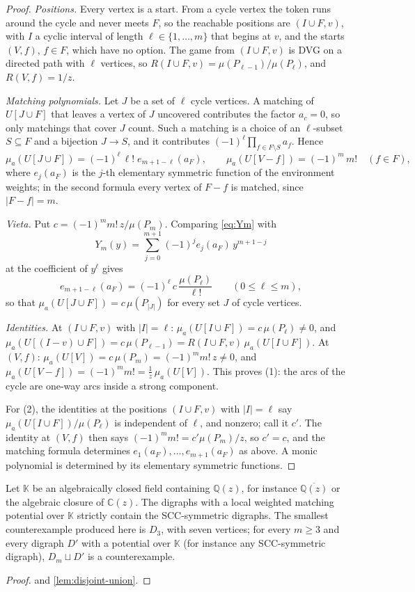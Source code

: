 \documentclass[final]{siamart0516}
\numberwithin{theorem}{section}
\numberwithin{equation}{section}
\theoremstyle{siamnonum}
\theoremstyle{plain}
\newcommand{\QQ}{\mathbb{Q}}
\newcommand{\CC}{\mathbb{C}}
\newcommand{\Qz}{\QQ(z)}
\newcommand{\Qzbar}{\overline{\QQ(z)}}
\begin{document}
\begin{proof}
\emph{Positions.} Every vertex is a start. From a cycle vertex the token runs around the cycle and never meets $F$, so the reachable positions are $(I\cup F,v)$, with $I$ a cyclic interval of length $\ell\in\{1,\dots,m\}$ that begins at $v$, and the starts $(V,f)$, $f\in F$, which have no option. The game from $(I\cup F,v)$ is DVG on a directed path with $\ell$ vertices, so $R(I\cup F,v)=\mu(P_{\ell-1})/\mu(P_\ell)$, and $R(V,f)=1/z$.

\emph{Matching polynomials.} Let $J$ be a set of $\ell$ cycle vertices. A matching of $U[J\cup F]$ that leaves a vertex of $J$ uncovered contributes the factor $a_c=0$, so only matchings that cover $J$ count. Such a matching is a choice of an $\ell$-subset $S\subseteq F$ and a bijection $J\to S$, and it contributes $(-1)^{\ell}\prod_{f\in F\setminus S}a_f$. Hence
\[
\mu_a(U[J\cup F])=(-1)^{\ell}\,\ell!\;e_{m+1-\ell}(a_F),\qquad \mu_a(U[V-f])=(-1)^{m}\,m!\quad(f\in F),
\]
where $e_j(a_F)$ is the $j$-th elementary symmetric function of the environment weights; in the second formula every vertex of $F-f$ is matched, since $|F-f|=m$.

\emph{Vieta.} Put $c=(-1)^{m}m!\,z/\mu(P_m)$. Comparing \eqref{eq:Ym} with
\[
Y_m(y)=\sum_{j=0}^{m+1}(-1)^{j}e_j(a_F)\,y^{m+1-j}
\]
at the coefficient of $y^{\ell}$ gives
\[
e_{m+1-\ell}(a_F)=(-1)^{\ell}\,c\,\frac{\mu(P_\ell)}{\ell!}\qquad(0\le\ell\le m),
\]
so that $\mu_a(U[J\cup F])=c\,\mu(P_{|J|})$ for every set $J$ of cycle vertices.

\emph{Identities.} At $(I\cup F,v)$ with $|I|=\ell$: $\mu_a(U[I\cup F])=c\,\mu(P_\ell)\neq0$, and $\mu_a(U[(I-v)\cup F])=c\,\mu(P_{\ell-1})=R(I\cup F,v)\,\mu_a(U[I\cup F])$. At $(V,f)$: $\mu_a(U[V])=c\,\mu(P_m)=(-1)^{m}m!\,z\neq0$, and $\mu_a(U[V-f])=(-1)^{m}m!=\frac1z\,\mu_a(U[V])$. This proves (1): the arcs of the cycle are one-way arcs inside a strong component.

For (2), the identities at the positions $(I\cup F,v)$ with $|I|=\ell$ say $\mu_a(U[I\cup F])/\mu(P_\ell)$ is independent of $\ell$, and nonzero; call it $c'$. The identity at $(V,f)$ then says $(-1)^{m}m!=c'\mu(P_m)/z$, so $c'=c$, and the matching formula determines $e_1(a_F),\dots,e_{m+1}(a_F)$ as above. A monic polynomial is determined by its elementary symmetric functions.
\end{proof}

\begin{corollary}\label{cor:complex-false}
Let $\mathbb K$ be an algebraically closed field containing $\Qz$, for instance $\Qzbar$ or the algebraic closure of $\CC(z)$. The digraphs with a local weighted matching potential over $\mathbb K$ strictly contain the SCC-symmetric digraphs. The smallest counterexample produced here is $D_3$, with seven vertices; for every $m\ge3$ and every digraph $D'$ with a potential over $\mathbb K$ (for instance any SCC-symmetric digraph), $D_m\sqcup D'$ is a counterexample.
\end{corollary}
\begin{proof}
 and \cref{lem:disjoint-union}.
\end{proof}
\end{document}
